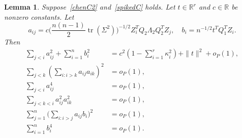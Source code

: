 \documentclass[review]{elsarticle}
\DeclareMathOperator{\mytr}{tr}
\theoremstyle{plain}
\newtheorem{lemma}{Lemma}
\theoremstyle{definition}
\theoremstyle{remark}
\begin{document}
\begin{lemma}
    Suppose~\eqref{chenC2} and~\eqref{spikedC} holds.
    Let $t\in\mathbb{R}^r$ and $c\in\mathbb{R}$ be nonzero constants.
    Let
$$
    a_{ij}=c\big(\frac{n(n-1)}{2} \mytr(\Sigma^2)\big)^{-1/2}Z_i^T Q_2 \Lambda_2 Q_2^T Z_j,
    \quad
    b_i=n^{-1/2} t^T Q_1^T Z_i.
$$
    Then
    \begin{align}
        \sum_{j<i}a_{ij}^2+\sum_{i=1}^n b_i^2&=c^2(1-\sum_{i=1}^r \kappa_i^2)+\|t\|^2+o_P(1),\label{lemma2Rn}\\
        \sum_{j<k}(\sum_{i:i>k}a_{ij} a_{ik})^2
        &=o_P(1),
    \label{lemma2R1}\\
        \sum_{j<i}a_{ij}^4&=o_P(1),
    \label{lemma2R2}\\
        \sum_{j<k<i}a_{ij}^2 a_{ik}^2 &=o_P(1),
    \label{lemma2R3}\\
        \sum_{j=1}^n \big(\sum_{i:i>j} a_{ij}b_i\big)^2 &=o_P(1),
    \label{lemma2R4}\\
        \sum_{i=1}^n b_i^4 &= o_P(1).
    \label{lemma2R5}
    \end{align}
\end{lemma}
\end{document}
